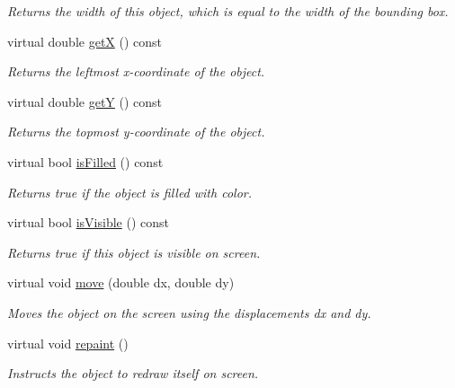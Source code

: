 \begin{DoxyCompactItemize}
\begin{DoxyCompactList}\small\item\em Returns the width of this object, which is equal to the width of the bounding box. \end{DoxyCompactList}\item 
virtual double \mbox{\hyperlink{classGObject_a344385751bee0720059403940d57a13e}{getX}} () const
\begin{DoxyCompactList}\small\item\em Returns the leftmost {\itshape x}-\/coordinate of the object. \end{DoxyCompactList}\item 
virtual double \mbox{\hyperlink{classGObject_aafa51c7f8f38a09febbb9ce7853f77b4}{getY}} () const
\begin{DoxyCompactList}\small\item\em Returns the topmost {\itshape y}-\/coordinate of the object. \end{DoxyCompactList}\item 
virtual bool \mbox{\hyperlink{classGObject_a11c404f106940c201b6f326e0355c150}{is\+Filled}} () const
\begin{DoxyCompactList}\small\item\em Returns {\ttfamily true} if the object is filled with color. \end{DoxyCompactList}\item 
virtual bool \mbox{\hyperlink{classGObject_a9d8a6cfb13917785c143e74d40e4e2be}{is\+Visible}} () const
\begin{DoxyCompactList}\small\item\em Returns {\ttfamily true} if this object is visible on screen. \end{DoxyCompactList}\item 
virtual void \mbox{\hyperlink{classGObject_a5973d8dda83afb36e2c56855515be392}{move}} (double dx, double dy)
\begin{DoxyCompactList}\small\item\em Moves the object on the screen using the displacements {\ttfamily dx} and {\ttfamily dy}. \end{DoxyCompactList}\item 
virtual void \mbox{\hyperlink{classGObject_ac827b978aa122f136a14c198687ad80f}{repaint}} ()
\begin{DoxyCompactList}\small\item\em Instructs the object to redraw itself on screen. \end{DoxyCompactList}\item 

\end{DoxyCompactItemize}
